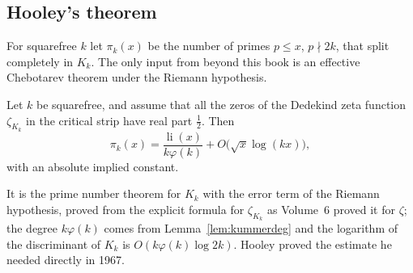 \subsection*{Hooley's theorem}

For squarefree $k$ let $\pi_k(x)$ be the number of primes $p\le x$, $p\nmid2k$, that split completely in $K_k$. The only input from beyond this book is an effective Chebotarev theorem under the Riemann hypothesis.

\begin{theorem}\label{thm:effcheb}
Let $k$ be squarefree, and assume that all the zeros of the Dedekind zeta function $\zeta_{K_k}$ in the critical strip have real part $\frac12$. Then
\[
\pi_k(x)=\frac{\operatorname{li}(x)}{k\varphi(k)}+O\bigl(\sqrt x\log(kx)\bigr),
\]
with an absolute implied constant.
\end{theorem}

It is the prime number theorem for $K_k$ with the error term of the Riemann hypothesis, proved from the explicit formula for $\zeta_{K_k}$ as Volume~6 proved it for $\zeta$; the degree $k\varphi(k)$ comes from Lemma~\ref{lem:kummerdeg} and the logarithm of the discriminant of $K_k$ is $O(k\varphi(k)\log 2k)$. Hooley proved the estimate he needed directly in 1967.

